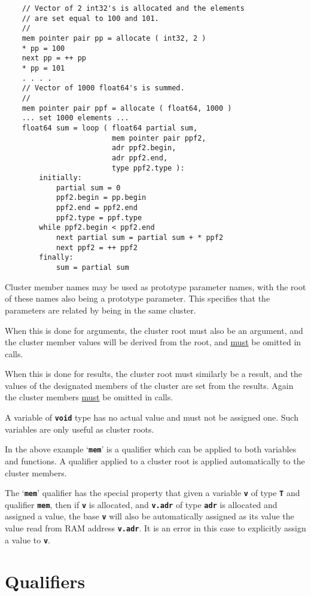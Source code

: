 \documentclass[12pt]{article}
\newcommand{\TT}[1]{{\tt \bfseries #1}}
\newenvironment{indpar}[1][0.3in]%
	{\begin{list}{}%
		     {\setlength{\itemsep}{0in}%
		      \setlength{\topsep}{0in}%
		      \setlength{\parsep}{1ex}%
		      \setlength{\labelwidth}{#1}%
		      \setlength{\leftmargin}{#1}%
		      \addtolength{\leftmargin}{\labelsep}}%
	 \item}%
	{\end{list}}
\begin{document}
\begin{indpar}
\begin{verbatim}
    // Vector of 2 int32's is allocated and the elements
    // are set equal to 100 and 101.
    //
    mem pointer pair pp = allocate ( int32, 2 )
    * pp = 100
    next pp = ++ pp
    * pp = 101
    . . . .
    // Vector of 1000 float64's is summed.
    //
    mem pointer pair ppf = allocate ( float64, 1000 )
    ... set 1000 elements ...
    float64 sum = loop ( float64 partial sum,
                         mem pointer pair ppf2,
                         adr ppf2.begin,
                         adr ppf2.end,
                         type ppf2.type ):
        initially:
            partial sum = 0
            ppf2.begin = pp.begin
            ppf2.end = ppf2.end
            ppf2.type = ppf.type
        while ppf2.begin < ppf2.end
            next partial sum = partial sum + * ppf2
            next ppf2 = ++ ppf2
        finally:
            sum = partial sum
\end{verbatim}\end{indpar}

Cluster member names may be used as prototype parameter
names, with the root of these names also being a prototype
parameter.  This specifies that the parameters are related
by being in the same cluster.

When this is done for arguments, the cluster root must
also be an argument, and the cluster member values
will be derived from the root, and \underline{must}
be omitted in calls.

When this is done for results, the cluster root must similarly
be a result, and the values of the designated
members of the cluster are set from the results.
Again the cluster members \underline{must} be omitted in calls.

A variable of \TT{void} type has no actual value
and must not be assigned one.  Such variables are only useful
as cluster roots.

In the above example `\TT{mem}' is a qualifier
which can be applied to both variables and functions.
A qualifier applied to a cluster root is applied automatically
to the cluster members.

The `\TT{mem}' qualifier has the special property that given a variable
\TT{v} of type \TT{T} and qualifier \TT{mem}, then if \TT{v} is allocated,
and \TT{v.adr} of type \TT{adr} is allocated and
assigned a value, the base \TT{v} will also be automatically
assigned as its value the value read from RAM address \TT{v.adr}.
It is an error in this case to explicitly assign a value to \TT{v}.

\section{Qualifiers}
\label{QUALIFIERS}
\end{document}
